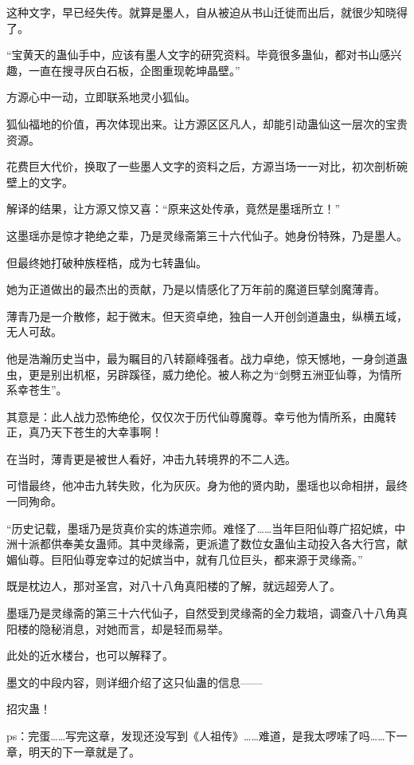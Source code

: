 \begin{this_body}
这种文字，早已经失传。就算是墨人，自从被迫从书山迁徙而出后，就很少知晓得了。

“宝黄天的蛊仙手中，应该有墨人文字的研究资料。毕竟很多蛊仙，都对书山感兴趣，一直在搜寻灰白石板，企图重现乾坤晶壁。”

方源心中一动，立即联系地灵小狐仙。

狐仙福地的价值，再次体现出来。让方源区区凡人，却能引动蛊仙这一层次的宝贵资源。

花费巨大代价，换取了一些墨人文字的资料之后，方源当场一一对比，初次剖析碗壁上的文字。

解译的结果，让方源又惊又喜：“原来这处传承，竟然是墨瑶所立！”

这墨瑶亦是惊才艳绝之辈，乃是灵缘斋第三十六代仙子。她身份特殊，乃是墨人。

但最终她打破种族桎梏，成为七转蛊仙。

她为正道做出的最杰出的贡献，乃是以情感化了万年前的魔道巨擘剑魔薄青。

薄青乃是一介散修，起于微末。但天资卓绝，独自一人开创剑道蛊虫，纵横五域，无人可敌。

他是浩瀚历史当中，最为瞩目的八转巅峰强者。战力卓绝，惊天憾地，一身剑道蛊虫，更是别出机枢，另辟蹊径，威力绝伦。被人称之为“剑劈五洲亚仙尊，为情所系幸苍生”。

其意是：此人战力恐怖绝伦，仅仅次于历代仙尊魔尊。幸亏他为情所系，由魔转正，真乃天下苍生的大幸事啊！

在当时，薄青更是被世人看好，冲击九转境界的不二人选。

可惜最终，他冲击九转失败，化为灰灰。身为他的贤内助，墨瑶也以命相拼，最终一同殉命。

“历史记载，墨瑶乃是货真价实的炼道宗师。难怪了……当年巨阳仙尊广招妃嫔，中洲十派都供奉美女蛊师。其中灵缘斋，更派遣了数位女蛊仙主动投入各大行宫，献媚仙尊。巨阳仙尊宠幸过的妃嫔当中，就有几位巨头，都来源于灵缘斋。”

既是枕边人，那对圣宫，对八十八角真阳楼的了解，就远超旁人了。

墨瑶乃是灵缘斋的第三十六代仙子，自然受到灵缘斋的全力栽培，调查八十八角真阳楼的隐秘消息，对她而言，却是轻而易举。

此处的近水楼台，也可以解释了。

墨文的中段内容，则详细介绍了这只仙蛊的信息——

招灾蛊！

ps：完蛋……写完这章，发现还没写到《人祖传》……难道，是我太啰嗦了吗……下一章，明天的下一章就是了。

\end{this_body}

